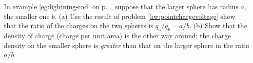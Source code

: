 In example \ref{eg:lightning-rod} on p.~\pageref{eg:lightning-rod}, suppose that the
larger sphere has radius $a$, the smaller one $b$. (a) Use the result of problem
\ref{hw:pointchargevoltage} show that the ratio of the charges on the two spheres
is $q_a/q_b=a/b$. (b) Show that the density of charge (charge per unit area)
is the other way around: the charge density on the smaller sphere is \emph{greater}
than that on the larger sphere in the ratio $a/b$.
